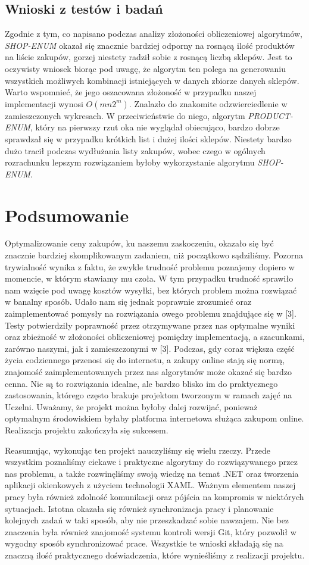 \documentclass[a4paper]{article}
\let\oldsection\section
\renewcommand\section{\clearpage\oldsection}
\begin{document}
\subsection{Wnioski z testów i badań}
Zgodnie z tym, co napisano podczas analizy złożoności obliczeniowej algorytmów, \textit{SHOP-ENUM} okazał się znacznie bardziej odporny na rosnącą ilość produktów na liście zakupów, gorzej niestety radził sobie z rosnącą liczbą sklepów. Jest to oczywisty wniosek biorąc pod uwagę, że algorytm ten polega na generowaniu wszystkich możliwych kombinacji istniejących w danych zbiorze danych sklepów. Warto wspomnieć, że jego oszacowana złożoność w przypadku naszej implementacji wynosi $O(mn2^m)$. Znalazło do znakomite odzwierciedlenie w zamieszczonych wykresach. W przeciwieństwie do niego, algorytm \textit{PRODUCT-ENUM}, który na pierwszy rzut oka nie wyglądał obiecująco, bardzo dobrze sprawdzał się w przypadku krótkich list i dużej ilości sklepów. Niestety bardzo dużo tracił podczas wydłużania listy zakupów, wobec czego w ogólnych rozrachunku lepszym rozwiązaniem byłoby wykorzystanie algorytmu \textit{SHOP-ENUM}.
\section{Podsumowanie}
Optymalizowanie ceny zakupów, ku naszemu zaskoczeniu, okazało się być znacznie bardziej skomplikowanym zadaniem, niż początkowo sądziliśmy. Pozorna trywialność wynika z faktu, że zwykle trudność problemu poznajemy dopiero w momencie, w którym stawiamy mu czoła. W tym przypadku trudność sprawiło nam wzięcie pod uwagę kosztów wysyłki, bez których problem można rozwiązać w banalny sposób. Udało nam się jednak poprawnie zrozumieć oraz zaimplementować pomysły na rozwiązania owego problemu znajdujące się w [3]. Testy potwierdziły poprawność przez otrzymywane przez nas optymalne wyniki oraz zbieżność w złożoności obliczeniowej pomiędzy implementacją, a szacunkami, zarówno naszymi, jak i zamieszczonymi w [3]. Podczas, gdy coraz większa część życia codziennego przenosi się do internetu, a zakupy online stają się normą, znajomość zaimplementowanych przez nas algorytmów może okazać się bardzo cenna. Nie są to rozwiązania idealne, ale bardzo blisko im do praktycznego zastosowania, którego często brakuje projektom tworzonym w ramach zajęć na Uczelni. Uważamy, że projekt można byłoby dalej rozwijać, ponieważ optymalnym środowiskiem byłaby platforma internetowa służąca zakupom online. Realizacja projektu zakończyła się sukcesem.

Reasumując, wykonując ten projekt nauczyliśmy się wielu rzeczy. Przede wszystkim poznaliśmy ciekawe i praktyczne algorytmy do rozwiązywanego przez nas problemu, a także rozwinęliśmy swoją wiedzę na temat .NET oraz tworzenia aplikacji okienkowych z użyciem technologii XAML. Ważnym elementem naszej pracy była również zdolność komunikacji oraz pójścia na kompromis w niektórych sytuacjach. Istotna okazała się również synchronizacja pracy i planowanie kolejnych zadań w taki sposób, aby nie przeszkadzać sobie nawzajem. Nie bez znaczenia była również znajomość systemu kontroli wersji Git, który pozwolił w wygodny sposób synchronizować prace. Wszystkie te wnioski składają się na znaczną ilość praktycznego doświadczenia, które wynieśliśmy z realizacji projektu. 
\end{document}
